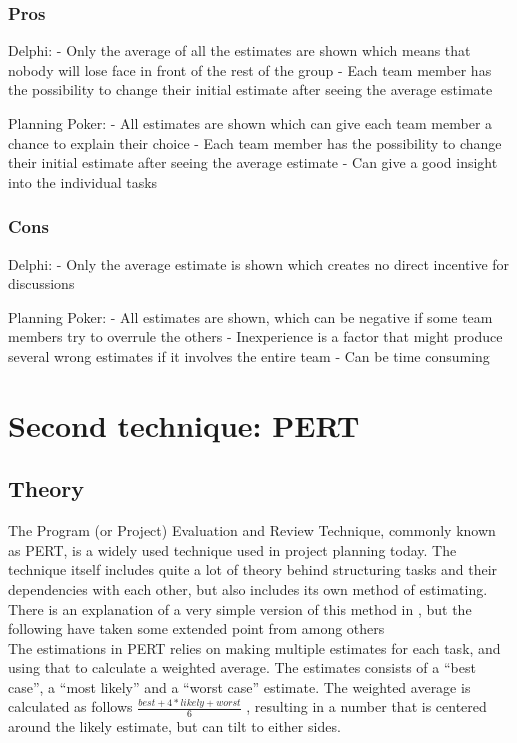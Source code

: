 \subsubsection{Pros}

Delphi: 
- Only the average of all the estimates are shown which means that nobody will lose face in front of the rest of the group
- Each team member has the possibility to change their initial estimate after seeing the average estimate

Planning Poker:
- All estimates are shown which can give each team member a chance to explain their choice
- Each team member has the possibility to change their initial estimate after seeing the average estimate
- Can give a good insight into the individual tasks




\subsubsection{Cons}

Delphi:
- Only the average estimate is shown which creates no direct incentive for discussions

Planning Poker:
- All estimates are shown, which can be negative if some team members try to overrule the others
- Inexperience is a factor that might produce several wrong estimates if it involves the entire team
- Can be time consuming

\section{Second technique: PERT}
\subsection{Theory}

The Program (or Project) Evaluation and Review Technique, commonly known as PERT, is a widely used technique used in project planning today. The technique itself includes quite a lot of theory behind structuring tasks and their dependencies with each other, but also includes its own method of estimating. There is an explanation of a very simple version of this method in \cite[p.152]{ProjectManagement_b}, but the following have taken some extended point from \cite{TynerBlain_w} among others\\

The estimations in PERT relies on making multiple estimates for each task, and using that to calculate a weighted average. The estimates consists of a ``best case'', a ``most likely'' and a ``worst case'' estimate. The weighted average is calculated as follows
$\frac{best+4*likely+worst}{6}$
, resulting in a number that is centered around the likely estimate, but can tilt to either sides.\
 
